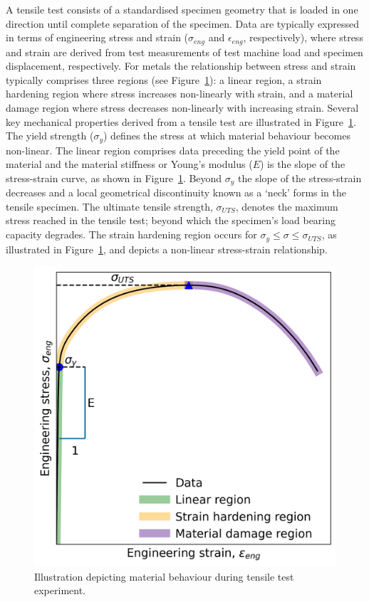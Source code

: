 \documentclass[preprint, review, 12pt]{elsarticle}
\begin{document}
	A tensile test consists of a standardised specimen geometry that is loaded in one direction until complete separation of the specimen.
	Data are typically expressed in terms of engineering stress and strain ($\sigma_{eng}$ and $\epsilon_{eng}$, respectively), where stress and strain are derived from test measurements of test machine load and specimen displacement, respectively.
	For metals the relationship between stress and strain typically comprises three regions (see Figure~\ref{fig:eng_ss}): a linear region, a strain hardening region where stress increases non-linearly with strain, and a material damage region where stress decreases non-linearly with increasing strain.
	Several key mechanical properties derived from a tensile test are illustrated in Figure~\ref{fig:eng_ss}.
	The yield strength ($\sigma_y$) defines the stress at which material behaviour becomes non-linear.
	The linear region comprises data preceding the yield point of the material and the material stiffness or Young's modulus ($E$) is the slope of the stress-strain curve, as shown in Figure~\ref{fig:eng_ss}.
	Beyond $\sigma_y$ the slope of the stress-strain decreases and a local geometrical discontinuity known as a `neck' forms in the tensile specimen.
	The ultimate tensile strength, $\sigma_{UTS}$, denotes the maximum stress reached in the tensile test; beyond which the specimen's load bearing capacity degrades.
	The strain hardening region occurs for $\sigma_y \leq \sigma \leq \sigma_{UTS}$, as illustrated in Figure~\ref{fig:eng_ss}, and depicts a non-linear stress-strain relationship.
	\begin{figure}[!htbp]
		\centering
		\includegraphics[width=\linewidth, height=0.4\textheight, keepaspectratio]{DIAGRAM_ENG_SS}
		\caption{Illustration depicting material behaviour during tensile test experiment.}
		\label{fig:eng_ss}
	\end{figure}
\end{document}
